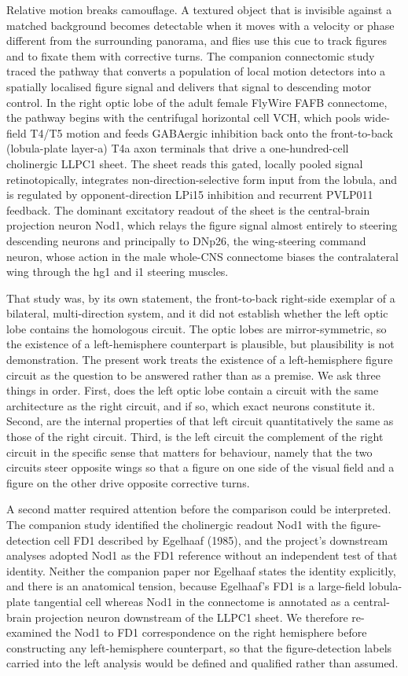 \documentclass[11pt]{article}
\begin{document}
Relative motion breaks camouflage. A textured object that is invisible against a matched
background becomes detectable when it moves with a velocity or phase different from the
surrounding panorama, and flies use this cue to track figures and to fixate them with corrective
turns. The companion connectomic study traced the pathway that converts a population of local
motion detectors into a spatially localised figure signal and delivers that signal to descending
motor control. In the right optic lobe of the adult female FlyWire FAFB connectome, the pathway
begins with the centrifugal horizontal cell VCH, which pools wide-field T4/T5 motion and feeds
GABAergic inhibition back onto the front-to-back (lobula-plate layer-a) T4a axon terminals that
drive a one-hundred-cell cholinergic LLPC1 sheet. The sheet reads this gated, locally pooled
signal retinotopically, integrates non-direction-selective form input from the lobula, and is
regulated by opponent-direction LPi15 inhibition and recurrent PVLP011 feedback. The dominant
excitatory readout of the sheet is the central-brain projection neuron Nod1, which relays the
figure signal almost entirely to steering descending neurons and principally to DNp26, the
wing-steering command neuron, whose action in the male whole-CNS connectome biases the
contralateral wing through the hg1 and i1 steering muscles.

That study was, by its own statement, the front-to-back right-side exemplar of a bilateral,
multi-direction system, and it did not establish whether the left optic lobe contains the
homologous circuit. The optic lobes are mirror-symmetric, so the existence of a left-hemisphere
counterpart is plausible, but plausibility is not demonstration. The present work treats the
existence of a left-hemisphere figure circuit as the question to be answered rather than as a
premise. We ask three things in order. First, does the left optic lobe contain a circuit with the
same architecture as the right circuit, and if so, which exact neurons constitute it. Second, are
the internal properties of that left circuit quantitatively the same as those of the right
circuit. Third, is the left circuit the complement of the right circuit in the specific sense
that matters for behaviour, namely that the two circuits steer opposite wings so that a figure on
one side of the visual field and a figure on the other drive opposite corrective turns.

A second matter required attention before the comparison could be interpreted. The companion
study identified the cholinergic readout Nod1 with the figure-detection cell FD1 described by
Egelhaaf (1985), and the project's downstream analyses adopted Nod1 as the FD1 reference without
an independent test of that identity. Neither the companion paper nor Egelhaaf states the
identity explicitly, and there is an anatomical tension, because Egelhaaf's FD1 is a large-field
lobula-plate tangential cell whereas Nod1 in the connectome is annotated as a central-brain
projection neuron downstream of the LLPC1 sheet. We therefore re-examined the Nod1 to FD1
correspondence on the right hemisphere before constructing any left-hemisphere counterpart, so
that the figure-detection labels carried into the left analysis would be defined and qualified
rather than assumed.
\end{document}
